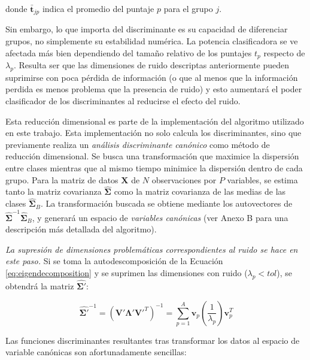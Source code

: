 \documentclass[12pt]{article}
\begin{document}
donde $\bar{\mathbf{t}}_{jp}$ indica el promedio del puntaje $p$ para el grupo $j$.

Sin embargo, lo que importa del discriminante es su capacidad de diferenciar grupos, no simplemente su estabilidad numérica. La potencia clasificadora se ve afectada más bien dependiendo del tamaño relativo de los puntajes $t_p$ respecto de $\lambda_p$. Resulta ser que las dimensiones de ruido descriptas anteriormente pueden suprimirse con poca pérdida de información (o que al menos que la información perdida es menos problema que la presencia de ruido) y esto aumentará el poder clasificador de los discriminantes al reducirse el efecto del ruido.

Esta reducción dimensional es parte de la implementación del algoritmo utilizado en este trabajo. Esta implementación no solo calcula los discriminantes, sino que previamente realiza un \textit{análisis discriminante canónico} como método de reducción dimensional. Se busca una transformación que maximice la dispersión entre clases mientras que al mismo tiempo minimice la dispersión dentro de cada grupo. Para la matriz de datos $\mathbf{X}$ de $N$ observaciones por $P$ variables, se estima tanto la matriz covarianza $\hat{\boldsymbol{\Sigma}}$ como la matriz covarianza de las medias de las clases $\hat{\boldsymbol{\Sigma}}_B$. La transformación buscada se obtiene mediante los autovectores de $\hat{\boldsymbol{\Sigma}}^{-1}\hat{\boldsymbol{\Sigma}}_B$, y generará un espacio de 
\textit{variables canónicas} (ver Anexo B para una descripción más detallada del algoritmo). 

\textit{La supresión de dimensiones problemáticas correspondientes al ruido se hace en este paso.} Si se toma la autodescomposición de la Ecuación \ref{eq:eigendecomposition} y se suprimen las dimensiones con ruido ($\lambda_p < tol$), se obtendrá la matriz $\hat{\boldsymbol{\Sigma}'}$:

\begin{equation} \label{eq:reduction}
\hat{\boldsymbol{\Sigma}'}^{-1} = (\mathbf{V}' \boldsymbol{\Lambda}' \mathbf{V}'^T)^{-1} = \sum_{p = 1}^{A} \mathbf{v}_p (\frac{1}{\lambda_p}) \mathbf{v}_p^T 
\end{equation}


Las funciones discriminantes resultantes tras transformar los datos al espacio de variable canónicas son afortunadamente sencillas:
\end{document}
